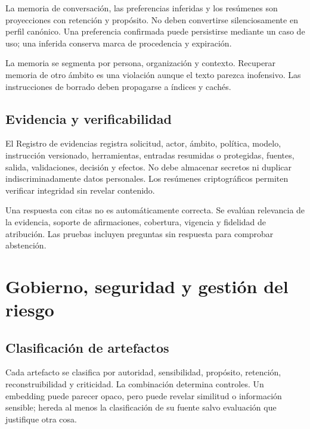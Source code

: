 La memoria de conversación, las preferencias inferidas y los resúmenes son proyecciones
con retención y propósito. No deben convertirse silenciosamente en perfil canónico. Una
preferencia confirmada puede persistirse mediante un caso de uso; una inferida conserva
marca de procedencia y expiración.

La memoria se segmenta por persona, organización y contexto. Recuperar memoria de otro ámbito
es una violación aunque el texto parezca inofensivo. Las instrucciones de borrado deben
propagarse a índices y cachés.

\section{Evidencia y verificabilidad}

El Registro de evidencias registra solicitud, actor, ámbito, política, modelo, instrucción versionado,
herramientas, entradas resumidas o protegidas, fuentes, salida, validaciones, decisión y
efectos. No debe almacenar secretos ni duplicar indiscriminadamente datos personales.
Los resúmenes criptográficos permiten verificar integridad sin revelar contenido.

Una respuesta con citas no es automáticamente correcta. Se evalúan relevancia de la
evidencia, soporte de afirmaciones, cobertura, vigencia y fidelidad de atribución. Las
pruebas incluyen preguntas sin respuesta para comprobar abstención.

\chapter{Gobierno, seguridad y gestión del riesgo}

\section{Clasificación de artefactos}

Cada artefacto se clasifica por autoridad, sensibilidad, propósito, retención,
reconstruibilidad y criticidad. La combinación determina controles. Un embedding puede
parecer opaco, pero puede revelar similitud o información sensible; hereda al menos la
clasificación de su fuente salvo evaluación que justifique otra cosa.

